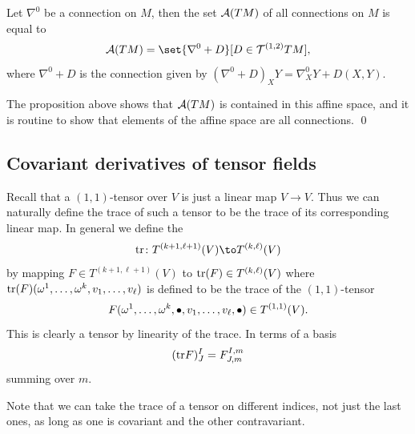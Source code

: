 \eproof

\bthrm

    Let $\nabla^0$ be a connection on $M$, then the set ${{\cal A}}(TM)$ of all connections on $M$ is equal to
    $$ \A(TM) = \set{\nabla^0 + D}[D\in\T^{(1,2)}TM] , $$
    where $\nabla^0+D$ is the connection given by $(\nabla^0+D)_XY=\nabla^0_XY+D(X,Y)$.

\ethrm

\bproof

    The proposition above shows that ${{\cal A}}(TM)$ is contained in this affine space, and it is routine to show that elements of
    the affine space are all connections.
    \qed

\eproof

\subsection{Covariant derivatives of tensor fields}

Recall that a $(1,1)$-tensor over $V$ is just a linear map $V\to V$.
Thus we can naturally define the trace of such a tensor to be the trace of its corresponding linear map.
In general we define the 
$$ \tr\colon T^{(k+1,\ell+1)}(V) \to T^{(k,\ell)}(V) $$
by mapping $F\in T^{(k+1,\ell+1)}(V)$ to ${\rm tr}(F)\in T^{(k,\ell)}(V)$ where ${\rm tr}(F)(\omega^1,\dots,\omega^k,v_1,\dots,v_\ell)$
is defined to be the trace of the $(1,1)$-tensor
$$ F(\omega^1,\dots,\omega^k,\bullet,v_1,\dots,v_\ell,\bullet) \in T^{(1,1)}(V) . $$
This is clearly a tensor by linearity of the trace.
In terms of a basis
$$ ({\rm tr} F)^I_J = F^{I,m}_{J,m} $$
summing over $m$.

Note that we can take the trace of a tensor on different indices, not just the last ones, as long as one is covariant and
the other contravariant.

\bprop

